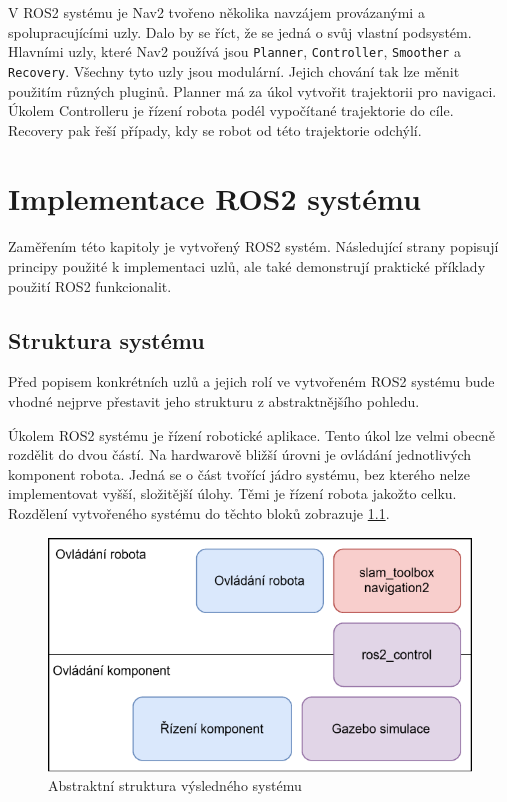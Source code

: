 V ROS2 systému je Nav2 tvořeno několika navzájem provázanými a spolupracujícími uzly. Dalo by se říct, že se jedná o svůj vlastní podsystém. Hlavními uzly, které Nav2 používá jsou \verb|Planner|, \verb|Controller|, \verb|Smoother| a \verb|Recovery|. Všechny tyto uzly jsou modulární. Jejich chování tak lze měnit použitím různých pluginů. Planner má za úkol vytvořit trajektorii pro navigaci. Úkolem Controlleru je řízení robota podél vypočítané trajektorie do cíle. Recovery pak řeší případy, kdy se robot od této trajektorie odchýlí. \cite{nav2_documentation}

\chapter{Implementace ROS2 systému}
Zaměřením této kapitoly je vytvořený ROS2 systém. Následující strany popisují principy použité k implementaci uzlů, ale také demonstrují praktické příklady použití ROS2 funkcionalit.

\section{Struktura systému}
Před popisem konkrétních uzlů a jejich rolí ve vytvořeném ROS2 systému bude vhodné nejprve přestavit jeho strukturu z abstraktnějšího pohledu.

Úkolem ROS2 systému je řízení robotické aplikace. Tento úkol lze velmi obecně rozdělit do dvou částí. Na hardwarově bližší úrovni je ovládání jednotlivých komponent robota. Jedná se o část tvořící jádro systému, bez kterého nelze implementovat vyšší, složitější úlohy. Těmi je řízení robota jakožto celku. Rozdělení vytvořeného systému do těchto bloků zobrazuje \ref{fig:system_structure}. 

\begin{figure}[h!]
	\centering
	\includegraphics[scale=0.75]{obrazky-figures/system_structure.pdf}
	\caption{Abstraktní struktura výsledného systému}
	\label{fig:system_structure}
\end{figure}

